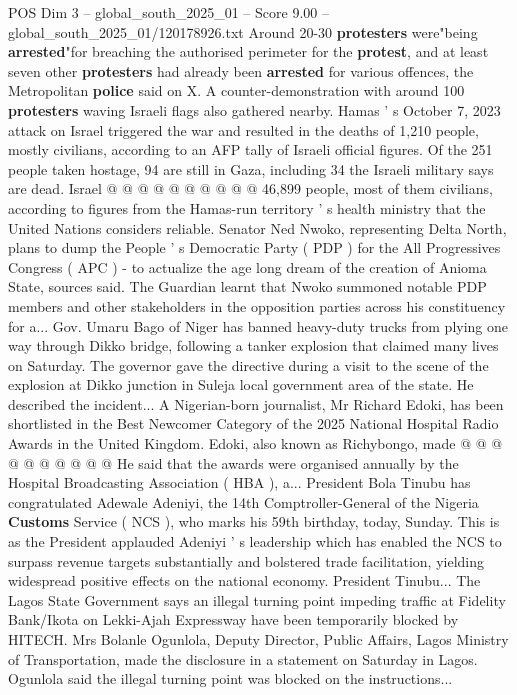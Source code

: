\begin{textsample}{POS Dim 3 – global\_south\_2025\_01 – Score 9.00 – global\_south\_2025\_01/120178926.txt}
Around 20-30 \textbf{protesters} were"being \textbf{arrested}"for breaching the authorised perimeter for the \textbf{protest}, and at least seven other \textbf{protesters} had already been \textbf{arrested} for various offences, the Metropolitan \textbf{police} said on X.
A counter-demonstration with around 100 \textbf{protesters} waving Israeli flags also gathered nearby.
Hamas ' s October 7, 2023 attack on Israel triggered the war and resulted in the deaths of 1,210 people, mostly civilians, according to an AFP tally of Israeli official figures.
Of the 251 people taken hostage, 94 are still in Gaza, including 34 the Israeli military says are dead.
Israel @ @ @ @ @ @ @ @ @ @ 46,899 people, most of them civilians, according to figures from the Hamas-run territory ' s health ministry that the United Nations considers reliable.
Senator Ned Nwoko, representing Delta North, plans to dump the People ' s Democratic Party ( PDP ) for the All Progressives Congress ( APC ) - to actualize the age long dream of the creation of Anioma State, sources said.
The Guardian learnt that Nwoko summoned notable PDP members and other stakeholders in the opposition parties across his constituency for a...
Gov.
Umaru Bago of Niger has banned heavy-duty trucks from plying one way through Dikko bridge, following a tanker explosion that claimed many lives on Saturday.
The governor gave the directive during a visit to the scene of the explosion at Dikko junction in Suleja local government area of the state.
He described the incident...
A Nigerian-born journalist, Mr Richard Edoki, has been shortlisted in the Best Newcomer Category of the 2025 National Hospital Radio Awards in the United Kingdom.
Edoki, also known as Richybongo, made @ @ @ @ @ @ @ @ @ @ He said that the awards were organised annually by the Hospital Broadcasting Association ( HBA ), a...
President Bola Tinubu has congratulated Adewale Adeniyi, the 14th Comptroller-General of the Nigeria \textbf{Customs} Service ( NCS ), who marks his 59th birthday, today, Sunday.
This is as the President applauded Adeniyi ' s leadership which has enabled the NCS to surpass revenue targets substantially and bolstered trade facilitation, yielding widespread positive effects on the national economy.
President Tinubu...
The Lagos State Government says an illegal turning point impeding traffic at Fidelity Bank/Ikota on Lekki-Ajah Expressway have been temporarily blocked by HITECH.
Mrs Bolanle Ogunlola, Deputy Director, Public Affairs, Lagos Ministry of Transportation, made the disclosure in a statement on Saturday in Lagos.
Ogunlola said the illegal turning point was blocked on the instructions...

\end{textsample}
